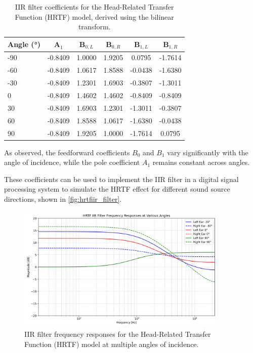 \begin{table}[H]
    \centering
    \caption{IIR filter coefficients for the Head-Related Transfer Function (HRTF) model, derived using the bilinear transform.}
    \label{tab:hrtfiir_coefficients}
    \begin{tabular}{lccccc}
        \toprule
        \textbf{Angle (°)} & \textbf{A$_1$} & \textbf{B$_{0,L}$} & \textbf{B$_{0,R}$} & \textbf{B$_{1,L}$} & \textbf{B$_{1,R}$} \\
        \midrule
        -90 & -0.8409 & 1.0000 & 1.9205 & 0.0795 & -1.7614 \\
        -60 & -0.8409 & 1.0617 & 1.8588 & -0.0438 & -1.6380 \\
        -30 & -0.8409 & 1.2301 & 1.6903 & -0.3807 & -1.3011 \\
         0  & -0.8409 & 1.4602 & 1.4602 & -0.8409 & -0.8409 \\
         30 & -0.8409 & 1.6903 & 1.2301 & -1.3011 & -0.3807 \\
         60 & -0.8409 & 1.8588 & 1.0617 & -1.6380 & -0.0438 \\
         90 & -0.8409 & 1.9205 & 1.0000 & -1.7614 & 0.0795 \\
        \bottomrule
    \end{tabular}
\end{table}

As observed, the feedforward coefficients \( B_0 \) and \( B_1 \) vary significantly with the angle of incidence, while the pole coefficient \( A_1 \) remains constant across angles.

These coefficients can be used to implement the IIR filter in a digital signal processing system to simulate the HRTF effect for different sound source directions, shown in \autoref{fig:hrtfiir_filter}.

\begin{figure}[H]
    \centering
    \includegraphics[width=0.9\textwidth]{data/figures/task_3/hrtfiir_freq_responses_multiple_angles.png}
    \caption{IIR filter frequency responses for the Head-Related Transfer Function (HRTF) model at multiple angles of incidence.}
    \label{fig:hrtfiir_filter}
\end{figure}

